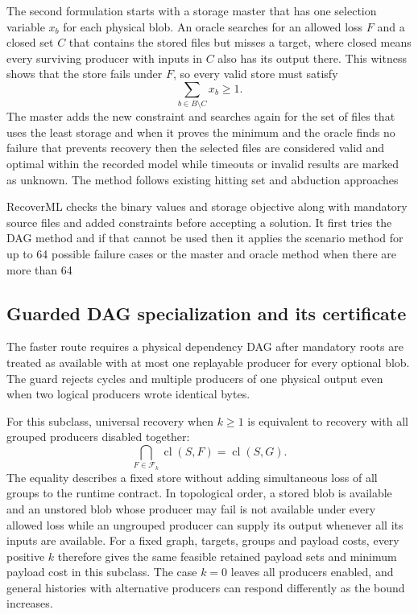 The second formulation starts with a storage master that has one selection variable $x_b$ for each physical blob. An oracle searches for an allowed loss $F$ and a closed set $C$ that contains the stored files but misses a target, where closed means every surviving producer with inputs in $C$ also has its output there. This witness shows that the store fails under $F$, so every valid store must satisfy
\begin{equation}
  \sum_{b\in B\setminus C}x_b\geq 1.
  \label{eq:cut}
\end{equation}
The master adds the new constraint and searches again for the set of files that uses the least storage and when it proves the minimum and the oracle finds no failure that prevents recovery then the selected files are considered valid and optimal within the recorded model while timeouts or invalid results are marked as unknown. The method follows existing hitting set and abduction approaches~\cite{hittingset}

RecoverML checks the binary values and storage objective along with mandatory source files and added constraints before accepting a solution. It first tries the DAG method and if that cannot be used then it applies the scenario method for up to 64 possible failure cases or the master and oracle method when there are more than 64

\subsection{Guarded DAG specialization and its certificate}

The faster route requires a physical dependency DAG after mandatory roots are treated as available with at most one replayable producer for every optional blob. The guard rejects cycles and multiple producers of one physical output even when two logical producers wrote identical bytes.

For this subclass, universal recovery when $k\geq1$ is equivalent to recovery with all grouped producers disabled together:
\begin{equation}
 \bigcap_{F\in\mathcal{F}_k}\operatorname{cl}(S,F)
   =\operatorname{cl}(S,G).
 \label{eq:collapse}
\end{equation}
The equality describes a fixed store without adding simultaneous loss of all groups to the runtime contract. In topological order, a stored blob is available and an unstored blob whose producer may fail is not available under every allowed loss while an ungrouped producer can supply its output whenever all its inputs are available. For a fixed graph, targets, groups and payload costs, every positive $k$ therefore gives the same feasible retained payload sets and minimum payload cost in this subclass. The case $k=0$ leaves all producers enabled, and general histories with alternative producers can respond differently as the bound increases.

